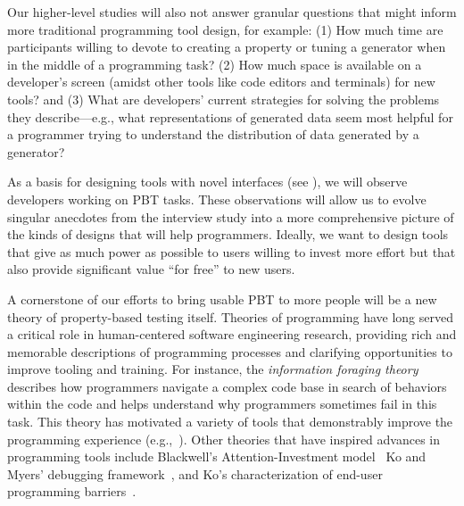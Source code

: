 %
Our higher-level studies will also not answer
granular questions that might
inform more traditional programming tool design, for example:
(1) How much time
are participants willing to devote to
creating a property or tuning a generator when in the
middle of a programming task?
(2) How much space is available on a developer's
screen (amidst other tools like code editors and terminals) for
new
tools? and
(3) What are developers' current strategies for solving the
problems they describe---e.g., what representations of generated data
seem most helpful
for a programmer trying to understand the distribution of data generated by a
generator?

As a basis for designing tools with novel interfaces (see
), we will observe developers working on PBT tasks. These
observations will allow us to evolve singular anecdotes from the
interview study into
a more comprehensive picture of the kinds of designs that will help programmers.
Ideally, we want to design tools that give as much power as possible
to users willing to
invest more effort but that also provide significant value ``for
free'' to new users.


%
A cornerstone of our efforts to bring usable PBT to more people
will be a new theory of property-based testing itself.  Theories of
programming have
long served a critical role in human-centered software engineering
research, providing rich and memorable descriptions of programming
processes and clarifying opportunities to improve tooling and training.
For instance, the {\em information foraging
  theory}~\cite{ref:lawrance2010programmers}
describes how programmers navigate a complex code base in search of behaviors
within the code and helps understand why programmers sometimes fail
in this task. This
theory has motivated a variety of tools that demonstrably improve the
programming experience (e.g.,~\cite{ref:henley2014patchworks}).  Other theories
that have inspired advances in programming tools include
Blackwell's Attention-Investment model~\cite{ref:blackwell2002first} Ko and
Myers' debugging framework~\cite{ref:ko2005framework}, and Ko's characterization
of end-user programming barriers~\cite{ref:ko2004six}.

